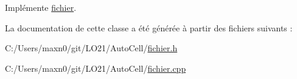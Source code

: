 Implémente \mbox{\hyperlink{classfichier_ac54bfc9ea8c980c0b46bb291d3abdef4}{fichier}}.



La documentation de cette classe a été générée à partir des fichiers suivants \+:\begin{DoxyCompactItemize}
\item 
C\+:/\+Users/maxn0/git/\+L\+O21/\+Auto\+Cell/\mbox{\hyperlink{fichier_8h}{fichier.\+h}}\item 
C\+:/\+Users/maxn0/git/\+L\+O21/\+Auto\+Cell/\mbox{\hyperlink{fichier_8cpp}{fichier.\+cpp}}\end{DoxyCompactItemize}
